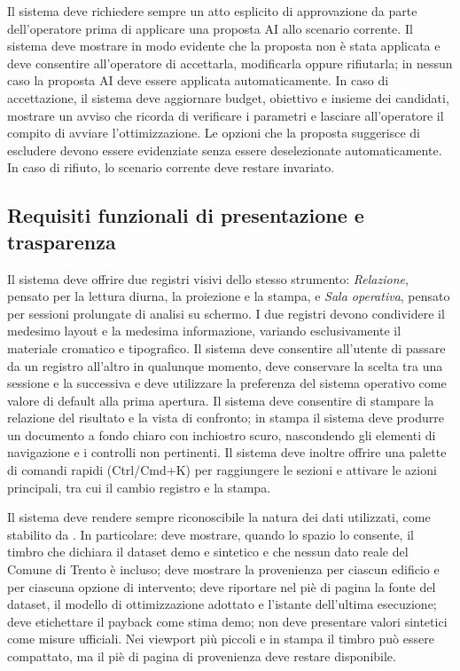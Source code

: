  \label{rf:ai_approvazione}
Il sistema deve richiedere sempre un atto esplicito di approvazione da parte dell'operatore prima di applicare una proposta AI allo scenario corrente. Il sistema deve mostrare in modo evidente che la proposta non è stata applicata e deve consentire all'operatore di accettarla, modificarla oppure rifiutarla; in nessun caso la proposta AI deve essere applicata automaticamente. In caso di accettazione, il sistema deve aggiornare budget, obiettivo e insieme dei candidati, mostrare un avviso che ricorda di verificare i parametri e lasciare all'operatore il compito di avviare l'ottimizzazione. Le opzioni che la proposta suggerisce di escludere devono essere evidenziate senza essere deselezionate automaticamente. In caso di rifiuto, lo scenario corrente deve restare invariato.

\subsection{Requisiti funzionali di presentazione e trasparenza}

 \label{rf:tema}
Il sistema deve offrire due registri visivi dello stesso strumento: \emph{Relazione}, pensato per la lettura diurna, la proiezione e la stampa, e \emph{Sala operativa}, pensato per sessioni prolungate di analisi su schermo. I due registri devono condividere il medesimo layout e la medesima informazione, variando esclusivamente il materiale cromatico e tipografico. Il sistema deve consentire all'utente di passare da un registro all'altro in qualunque momento, deve conservare la scelta tra una sessione e la successiva e deve utilizzare la preferenza del sistema operativo come valore di default alla prima apertura. Il sistema deve consentire di stampare la relazione del risultato e la vista di confronto; in stampa il sistema deve produrre un documento a fondo chiaro con inchiostro scuro, nascondendo gli elementi di navigazione e i controlli non pertinenti. Il sistema deve inoltre offrire una palette di comandi rapidi (Ctrl/Cmd+K) per raggiungere le sezioni e attivare le azioni principali, tra cui il cambio registro e la stampa.

 \label{rf:provenienza}
Il sistema deve rendere sempre riconoscibile la natura dei dati utilizzati, come stabilito da . In particolare: deve mostrare, quando lo spazio lo consente, il timbro che dichiara il dataset demo e sintetico e che nessun dato reale del Comune di Trento è incluso; deve mostrare la provenienza per ciascun edificio e per ciascuna opzione di intervento; deve riportare nel piè di pagina la fonte del dataset, il modello di ottimizzazione adottato e l'istante dell'ultima esecuzione; deve etichettare il payback come stima demo; non deve presentare valori sintetici come misure ufficiali. Nei viewport più piccoli e in stampa il timbro può essere compattato, ma il piè di pagina di provenienza deve restare disponibile.
